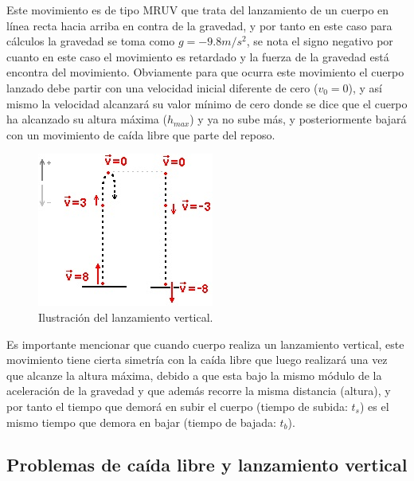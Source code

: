 \documentclass[a5paper,pagesize,10pt,bibtotoc,pointlessnumbers,
normalheadings,DIV=9,fleqn,x11names,table,twoside=false]{scrbook}
\begin{document}
Este movimiento es de tipo MRUV que trata del lanzamiento de un cuerpo en línea recta hacia arriba en contra de la gravedad, y 
por tanto en este caso para cálculos la gravedad se toma como $g = -9.8 m/s^2$, se nota el signo negativo por cuanto en este caso 
el movimiento es retardado y la fuerza de la gravedad está encontra del movimiento. Obviamente para que ocurra este movimiento el 
cuerpo lanzado debe partir con una velocidad inicial diferente de cero ($v_0 = 0$), y así mismo la velocidad alcanzará su valor 
mínimo de cero donde se dice que el cuerpo ha alcanzado su altura máxima ($h_{max}$) y ya no sube más, y posteriormente bajará con 
un movimiento de caída libre que parte del reposo.
 
\begin{figure}[ht]
 \centering
 \includegraphics[scale=0.7]{images/lanzamientovertical.jpg}
 \caption{Ilustración del lanzamiento vertical.}\label{lanzamientov}
\end{figure}   
 
Es importante mencionar que cuando cuerpo realiza un lanzamiento vertical, este movimiento tiene cierta simetría con la caída 
libre que luego realizará una vez que alcanze la altura máxima, debido a que esta bajo la mismo módulo de la aceleración de la 
gravedad y que además recorre la misma distancia (altura), y por tanto el tiempo que demorá en subir el cuerpo (tiempo de subida: 
$t_s$) es el mismo tiempo que demora en bajar (tiempo de bajada: $t_b$).

\subsection{Problemas de caída libre y lanzamiento vertical}
\end{document}
